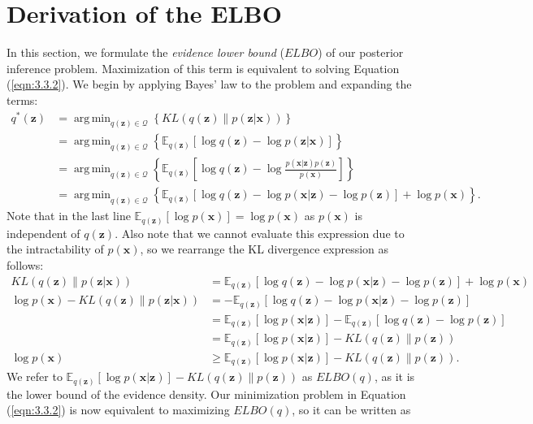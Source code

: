 \documentclass[honours,12pt, twoside]{unswthesis}
\DeclareMathOperator*{\argmin}{arg\,min}
\numberwithin{equation}{section}
\theoremstyle{definition}
\begin{document}
\section{Derivation of the ELBO}\label{sec:3.4}
In this section, we formulate the \textit{evidence lower bound} ($ELBO$) of our posterior inference problem. Maximization of this term is equivalent to solving Equation (\ref{eqn:3.3.2}). We begin by applying Bayes' law to the problem and expanding the terms:
\begin{align*}
q^*(\bm{z})&=\argmin_{q(\bm{z})\in \mathcal{Q}}\left\lbrace KL(q(\bm{z})\|p(\bm{z}|\bm{x}))\right\rbrace\\
&= \argmin_{q(\bm{z})\in \mathcal{Q}} \left\lbrace\mathbb{E}_{q(\bm{z})}[\log q(\bm{z})-\log p(\bm{z}|\bm{x})]\right\rbrace\\
&= \argmin_{q(\bm{z})\in \mathcal{Q}} \left\lbrace\mathbb{E}_{q(\bm{z})}\left[\log q(\bm{z})-\log\frac{p(\bm{x}|\bm{z})p(\bm{z})}{p(\bm{x})}\right]\right\rbrace\\
&= \argmin_{q(\bm{z})\in \mathcal{Q}} \left\lbrace\mathbb{E}_{q(\bm{z})}[\log q(\bm{z})-\log p(\bm{x}|\bm{z})-\log p(\bm{z})]+\log p(\bm{x})\right\rbrace.
\end{align*}
Note that in the last line $\mathbb{E}_{q(\bm{z})}[\log p(\bm{x})]=\log p(\bm{x})$ as $p(\bm{x})$ is independent of $q(\bm{z})$. Also note that we cannot evaluate this expression due to the intractability of $p(\bm{x})$, so we rearrange the KL divergence expression as follows:
\begin{align}
KL(q(\bm{z})\|p(\bm{z}|\bm{x}))&=\mathbb{E}_{q(\bm{z})}[\log q(\bm{z})-\log p(\bm{x}|\bm{z})-\log p(\bm{z})]+\log p(\bm{x}) \nonumber \\
\log p(\bm{x})-KL(q(\bm{z})\|p(\bm{z}|\bm{x}))&=-\mathbb{E}_{q(\bm{z})}[\log q(\bm{z})-\log p(\bm{x}|\bm{z})-\log p(\bm{z})]\nonumber \\
&=\mathbb{E}_{q(\bm{z})}[\log p(\bm{x}|\bm{z})]-\mathbb{E}_{q(\bm{z})}[\log q(\bm{z})-\log p(\bm{z})]\nonumber \\
&=\mathbb{E}_{q(\bm{z})}[\log p(\bm{x}|\bm{z})]-KL(q(\bm{z})\|p(\bm{z}))\nonumber\\
\log p(\bm{x})&\geq \mathbb{E}_{q(\bm{z})}[\log p(\bm{x}|\bm{z})]-KL(q(\bm{z})\|p(\bm{z})).
\end{align}
We refer to $\mathbb{E}_{q(\bm{z})}[\log p(\bm{x}|\bm{z})]-KL(q(\bm{z})\|p(\bm{z}))$ as $ELBO(q)$, as it is the lower bound of the evidence density. Our minimization problem in Equation (\ref{eqn:3.3.2}) is now equivalent to maximizing $ELBO(q)$, so it can be written as
\end{document}
